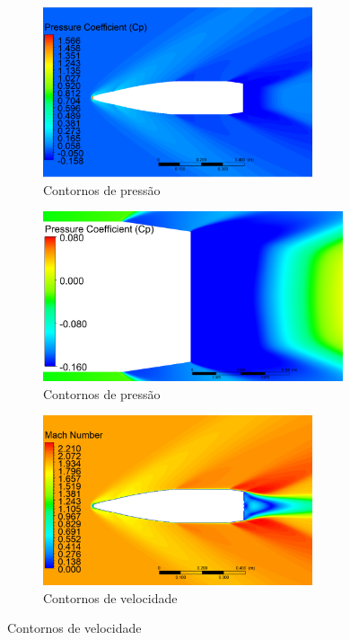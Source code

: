 \begin{figure}[!ht]
	\centering
	\begin{subfigure}[b]{0.47\textwidth}
        \centering
        \includegraphics[height=5cm,width=\textwidth]{contorno-pressao-SPALART-2pol.png}
        \caption{Contornos de pressão}
        \label{fig:contorno-pressao-bb-2pol-RANS}
    \end{subfigure}
    \hfill
    \begin{subfigure}[b]{0.47\textwidth}
        \centering
        \includegraphics[height=5cm,width=\textwidth]{coeficientepressao-SPALART}
        \caption{Contornos de pressão}
        \label{fig:contorno-pressao-base-bb-2pol-RANS}
    \end{subfigure}
    \hfill
    \begin{subfigure}[b]{0.47\textwidth}
        \centering
        \includegraphics[height=5cm,width=\textwidth]{contorno-velocidade-SPALART-2pol.png}
        \caption{Contornos de velocidade}
        \label{fig:contorno-velocidade-bb-2pol-RANS}
    \end{subfigure}

\end{figure}
